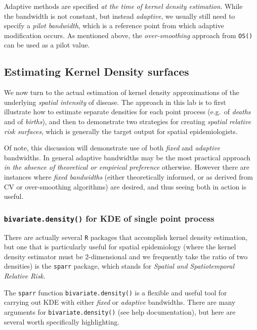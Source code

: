 \documentclass[
]{book}
\begin{document}
Adaptive methods are specified \emph{at the time of kernel density estimation}. While the bandwidth is not constant, but instead \emph{adaptive}, we usually still need to specify a \emph{pilot bandwidth}, which is a reference point from which adaptive modification occurs. As mentioned above, the \emph{over-smoothing} approach from \texttt{OS()} can be used as a pilot value.

\hypertarget{estimating-kernel-density-surfaces}{%
\subsection{Estimating Kernel Density surfaces}\label{estimating-kernel-density-surfaces}}

We now turn to the actual estimation of kernel density approximations of the underlying \emph{spatial intensity} of disease. The approach in this lab is to first illustrate how to estimate separate densities for each point process (e.g.~of \emph{deaths} and of \emph{births}), and then to demonstrate two strategies for creating \emph{spatial relative risk surfaces}, which is generally the target output for spatial epidemiologists.

Of note, this discussion will demonstrate use of both \emph{fixed} and \emph{adaptive} bandwidths. In general adaptive bandwidths may be the most practical approach \emph{in the absence of theoretical or empirical preference} otherwise. However there are instances where \emph{fixed bandwidths} (either theoretically informed, or as derived from CV or over-smoothing algorithms) are desired, and thus seeing both in action is useful.

\hypertarget{bivariate.density-for-kde-of-single-point-process}{%
\subsubsection{\texorpdfstring{\texttt{bivariate.density()} for KDE of single point process}{bivariate.density() for KDE of single point process}}\label{bivariate.density-for-kde-of-single-point-process}}

There are actually several \texttt{R} packages that accomplish kernel density estimation, but one that is particularly useful for spatial epidemiology (where the kernel density estimator must be 2-dimensional and we frequently take the ratio of two densities) is the \texttt{sparr} package, which stands for \emph{Spatial and Spatiotemporal Relative Risk}.

The \texttt{sparr} function \texttt{bivariate.density()} is a flexible and useful tool for carrying out KDE with either \emph{fixed} or \emph{adaptive} bandwidths. There are many arguments for \texttt{bivariate.density()} (see help documentation), but here are several worth specifically highlighting.
\end{document}
